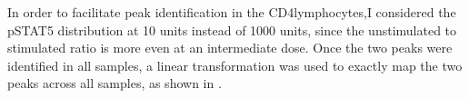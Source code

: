 In order to facilitate peak identification in the CD4\positive lymphocytes,I considered the pSTAT5 distribution at 10 units instead of 1000 units,
since the unstimulated to stimulated ratio is more even at an intermediate dose.
Once the two peaks were identified in all samples,
a linear transformation was used to exactly map the two peaks across all samples, as shown in .
\clearpage


